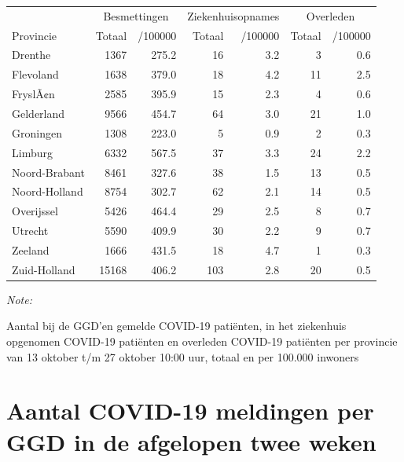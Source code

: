 \documentclass[
  english,
  man,floatsintext]{apa6}
\begin{document}
\begin{table}
\centering
\begin{threeparttable}
\begin{tabular}{lrrrrrr}
\toprule
\multicolumn{1}{c}{ } & \multicolumn{2}{c}{Besmettingen} & \multicolumn{2}{c}{Ziekenhuisopnames} & \multicolumn{2}{c}{Overleden} \\
\cmidrule(l{3pt}r{3pt}){2-3} \cmidrule(l{3pt}r{3pt}){4-5} \cmidrule(l{3pt}r{3pt}){6-7}
Provincie & Totaal & /100000 & Totaal & /100000 & Totaal & /100000\\
\midrule
Drenthe & 1367 & 275.2 & 16 & 3.2 & 3 & 0.6\\
Flevoland & 1638 & 379.0 & 18 & 4.2 & 11 & 2.5\\
FryslÃ¢n & 2585 & 395.9 & 15 & 2.3 & 4 & 0.6\\
Gelderland & 9566 & 454.7 & 64 & 3.0 & 21 & 1.0\\
Groningen & 1308 & 223.0 & 5 & 0.9 & 2 & 0.3\\
Limburg & 6332 & 567.5 & 37 & 3.3 & 24 & 2.2\\
Noord-Brabant & 8461 & 327.6 & 38 & 1.5 & 13 & 0.5\\
Noord-Holland & 8754 & 302.7 & 62 & 2.1 & 14 & 0.5\\
Overijssel & 5426 & 464.4 & 29 & 2.5 & 8 & 0.7\\
Utrecht & 5590 & 409.9 & 30 & 2.2 & 9 & 0.7\\
Zeeland & 1666 & 431.5 & 18 & 4.7 & 1 & 0.3\\
Zuid-Holland & 15168 & 406.2 & 103 & 2.8 & 20 & 0.5\\
\bottomrule
\end{tabular}
\begin{tablenotes}
\item \textit{Note: } 
\item Aantal bij de GGD’en gemelde COVID-19 patiënten, in het ziekenhuis opgenomen COVID-19 patiënten en overleden COVID-19 patiënten per provincie van 13 oktober t/m 27 oktober 10:00 uur, totaal en per 100.000 inwoners
\end{tablenotes}
\end{threeparttable}
\end{table}

\newpage

\hypertarget{aantal-covid-19-meldingen-per-ggd-in-de-afgelopen-twee-weken}{%
\section{Aantal COVID-19 meldingen per GGD in de afgelopen twee weken}\label{aantal-covid-19-meldingen-per-ggd-in-de-afgelopen-twee-weken}}
\end{document}
